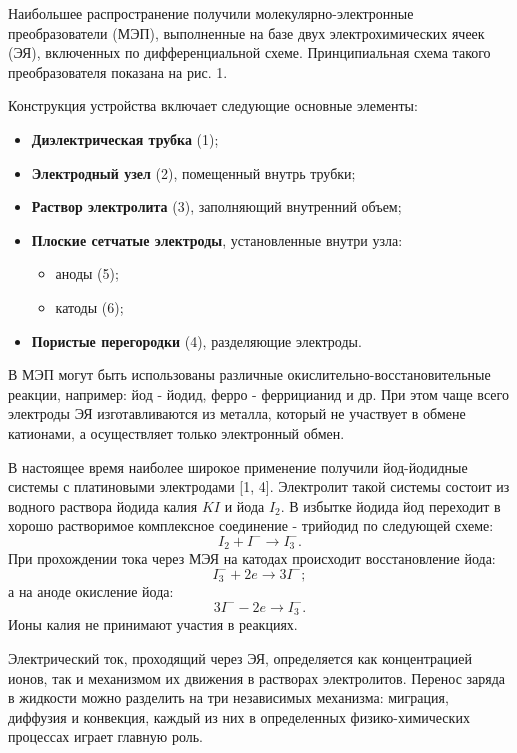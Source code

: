 \documentclass[12pt, a4paper]{article}
\begin{document}
\newpage
Наибольшее распространение получили молекулярно-электронные преобразователи (МЭП), выполненные на базе двух электрохимических ячеек (ЭЯ), включенных по дифференциальной схеме. Принципиальная схема такого преобразователя показана на рис. 1. 

Конструкция устройства включает следующие основные элементы:
\begin{itemize}[label=--]
    \item \textbf{Диэлектрическая трубка} (1);
    \item \textbf{Электродный узел} (2), помещенный внутрь трубки;
    \item \textbf{Раствор электролита} (3), заполняющий внутренний объем;
    \item \textbf{Плоские сетчатые электроды}, установленные внутри узла:
    \begin{itemize}
        \item аноды (5);
        \item катоды (6);
    \end{itemize}
    \item \textbf{Пористые перегородки} (4), разделяющие электроды.
\end{itemize}
В МЭП могут быть использованы различные окислительно-восстановительные реакции, например: йод - йодид, ферро - феррицианид и др. При этом чаще всего электроды ЭЯ изготавливаются из металла, который не участвует в обмене катионами, а осуществляет только электронный обмен.

В настоящее время наиболее широкое применение получили йод-йодидные системы с платиновыми электродами [1, 4]. Электролит такой системы состоит из водного раствора йодида калия $KI$ и йода $I_2$. В избытке йодида йод переходит в хорошо растворимое комплексное соединение - трийодид по следующей схеме:
\[
I_2 + I^- \rightarrow I_3^-.
\]
При прохождении тока через МЭЯ на катодах происходит восстановление йода:
\[
I_3^- + 2e \rightarrow 3I^-;
\]
а на аноде окисление йода:
\[
3I^- - 2e \rightarrow I_3^-.
\]
Ионы калия не принимают участия в реакциях.
\par

Электрический ток, проходящий через ЭЯ, определяется как концентрацией ионов, так и механизмом их движения в растворах электролитов. Перенос заряда в жидкости можно разделить на три независимых механизма: миграция, диффузия и конвекция, каждый из них в определенных физико-химических процессах играет главную роль.

\par
\end{document}
